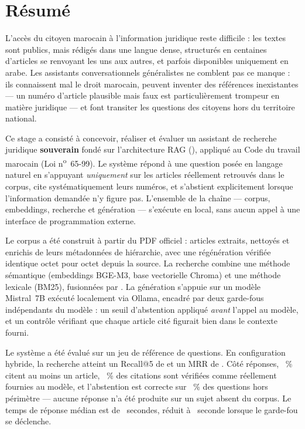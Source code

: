 \chapter*{Résumé}

L'accès du citoyen marocain à l'information juridique reste difficile : les textes sont
publics, mais rédigés dans une langue dense, structurés en centaines d'articles se renvoyant
les uns aux autres, et parfois disponibles uniquement en arabe. Les assistants conversationnels
généralistes ne comblent pas ce manque : ils connaissent mal le droit marocain, peuvent inventer
des références inexistantes --- un numéro d'article plausible mais faux est particulièrement
trompeur en matière juridique --- et font transiter les questions des citoyens hors du
territoire national.

Ce stage a consisté à concevoir, réaliser et évaluer un assistant de recherche juridique
\textbf{souverain} fondé sur l'architecture RAG (),
appliqué au Code du travail marocain (Loi n\textsuperscript{o}~65-99). Le système répond à une
question posée en langage naturel en s'appuyant \emph{uniquement} sur les articles réellement
retrouvés dans le corpus, cite systématiquement leurs numéros, et s'abstient explicitement
lorsque l'information demandée n'y figure pas. L'ensemble de la chaîne --- corpus, embeddings,
recherche et génération --- s'exécute en local, sans aucun appel à une interface de
programmation externe.

Le corpus a été construit à partir du PDF officiel : \NbArticles{} articles extraits, nettoyés
et enrichis de leurs métadonnées de hiérarchie, avec une régénération vérifiée identique octet
pour octet depuis la source. La recherche combine une méthode sémantique (embeddings BGE-M3,
base vectorielle Chroma) et une méthode lexicale (BM25), fusionnées par . La génération s'appuie sur un modèle Mistral~7B exécuté localement via Ollama, encadré
par deux garde-fous indépendants du modèle : un seuil d'abstention appliqué \emph{avant} l'appel
au modèle, et un contrôle vérifiant que chaque article cité figurait bien dans le contexte
fourni.

Le système a été évalué sur un jeu de référence de \NbQuestions{} questions. En configuration
hybride, la recherche atteint un Recall@5 de \RecallHybride{} et un MRR de \MrrHybride{}. Côté
réponses, \TauxCitation~\% citent au moins un article, \TauxVerif~\% des citations sont
vérifiées comme réellement fournies au modèle, et l'abstention est correcte sur
\TauxAbstention~\% des questions hors périmètre --- aucune réponse n'a été produite sur un sujet
absent du corpus. Le temps de réponse médian est de \LatTotale~secondes, réduit à
\LatAbstention~seconde lorsque le garde-fou se déclenche.

